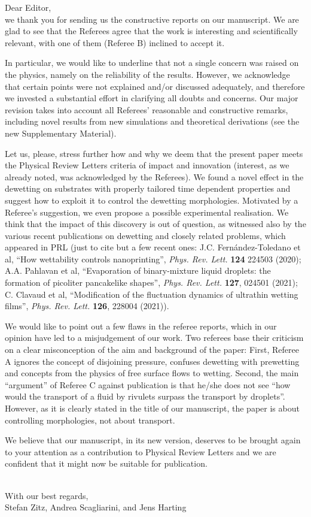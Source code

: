 \documentclass[12pt,english]{article}
\begin{document}
\vspace*{-3cm}

\noindent Dear Editor,\\

we thank you for sending us the constructive reports on our manuscript. We are glad to see 
that the Referees agree that the work is interesting and scientifically relevant, with one of them 
(Referee B) inclined to accept it.

In particular, we would like to underline that not a single 
concern was raised on the physics, namely on the reliability of the results.
However, we acknowledge that certain points were not explained and/or discussed adequately, and therefore we invested a substantial effort in clarifying all
doubts and concerns.
Our major revision takes into account all Referees' reasonable and constructive remarks, including novel 
results from new simulations and theoretical derivations (see the new Supplementary Material).

Let us, please, stress further how and why we deem that the present paper meets the Physical
Review Letters criteria of impact and innovation (interest, as we already noted, was acknowledged by the Referees).
We found a novel effect in the dewetting on substrates with properly tailored time dependent properties and 
suggest how to exploit it to control the dewetting morphologies. Motivated by a Referee's suggestion, we even propose a possible experimental realisation.
We think that the impact of this discovery is out of question, as witnessed also by the various recent publications on dewetting and closely related problems, which appeared in PRL 
(just to cite but a few recent ones: J.C. Fern\'andez-Toledano et al, ``How wettability controls nanoprinting'',
{\it Phys. Rev. Lett.} {\bf 124} 224503 (2020); A.A. Pahlavan et al,
``Evaporation of binary-mixture liquid droplets: the formation of picoliter pancakelike shapes'', {\it Phys. Rev. Lett.} {\bf 127}, 024501 (2021); 
C. Clavaud et al, ``Modification of the fluctuation dynamics of ultrathin wetting films'', {\it Phys. Rev. Lett.} {\bf 126}, 228004 (2021)).

We would like to point out a few flaws in the referee reports, which in our opinion have led to a misjudgement of our work. Two referees base their criticism on a clear misconception of the aim and background of the paper:
First, Referee A ignores the concept of disjoining pressure, confuses dewetting with prewetting and concepts from the physics of free surface flows to wetting.
Second, the main ``argument'' of Referee C against publication is that he/she does not see ``how would the transport of a fluid by rivulets 
surpass the transport by droplets''. However, as it is clearly stated in the title of our manuscript, the paper is about controlling morphologies, not about transport. 

We believe that our manuscript, in its new version, deserves to be brought again to your attention as a contribution to Physical Review Letters and we are 
confident that it might now be suitable for publication.

~\\
With our best regards,\\
Stefan Zitz, Andrea Scagliarini, and Jens Harting
\end{document}
